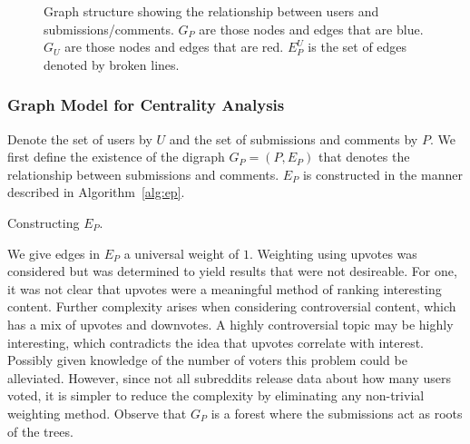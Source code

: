 \documentclass[letterpaper, 10 pt, conference]{ieeeconf}
\theoremstyle{definition}
\begin{document}
\begin{figure}
  \centering
  \caption{Graph structure showing the relationship between users and submissions/comments. \(G_P\) are those nodes and edges that are blue. \(G_U\) are those nodes and edges that are red. \(E_P^U\) is the set of edges denoted by broken lines.}
  \label{fig:model:hypergraph}
\end{figure}

\subsubsection{Graph Model for Centrality Analysis}
Denote the set of users by \(U\) and the set of submissions and comments by \(P.\) We first define the existence of the digraph \(G_P=(P,E_P)\) that denotes the relationship between submissions and comments. \(E_P\) is constructed in the manner described in Algorithm~\ref{alg:ep}.
\begin{algorithm}
  \caption{Constructing \(E_P.\)}
  \label{alg:ep}
\end{algorithm}
We give edges in \(E_P\) a universal weight of \(1.\) Weighting using upvotes was considered but was determined to yield results that were not desireable. For one, it was not clear that upvotes were a meaningful method of ranking interesting content. Further complexity arises when considering controversial content, which has a mix of upvotes and downvotes. A highly controversial topic may be highly interesting, which contradicts the idea that upvotes correlate with interest. Possibly given knowledge of the number of voters this problem could be alleviated. However, since not all subreddits release data about how many users voted, it is simpler to reduce the complexity by eliminating any non-trivial weighting method. Observe that \(G_P\) is a forest where the submissions act as roots of the trees.
\end{document}
